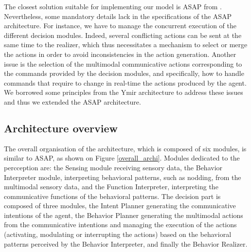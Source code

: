 The closest solution suitable for implementing our model is ASAP from \cite{kopp_architecture_2014}.
Nevertheless, some mandatory details lack in the specifications of the ASAP architecture. For instance, we have to manage the concurrent execution of the different decision modules. Indeed, several conflicting actions can be sent at the same time to the realizer, which thus necessitates a mechanism to select or merge the actions in order to avoid inconsistencies in the action generation. Another issue is the selection of the multimodal communicative actions corresponding to the commands provided by the decision modules, and specifically, how to handle commands that require to change in real-time the actions produced by the agent. 
We borrowed some principles from the Ymir architecture \cite{thorisson_mind_1999} to address these issues and thus we extended the ASAP architecture.  

\subsection{Architecture overview}

The overall organisation of the architecture, which is composed of six modules, is similar to ASAP, as shown on Figure \ref{overall_archi}. 
Modules dedicated to the percception are: 
the Sensing module receiving sensory data, 
the Behavior Interpreter module, interpreting behavioral patterns, such as nodding, from the multimodal sensory data, 
and the Function Interpreter, interpreting the communicative functions of the behavioral patterns. 
The decision part is composed of three modules, 
the Intent Planner generating the communicative intentions of the agent, 
the Behavior Planner generating the multimodal actions from the communicative intentions and managing the execution of the actions (activating, modulating or interrupting the actions) based on the behavioral patterns perceived by the Behavior Interpreter,
and finally the Behavior Realizer. 

